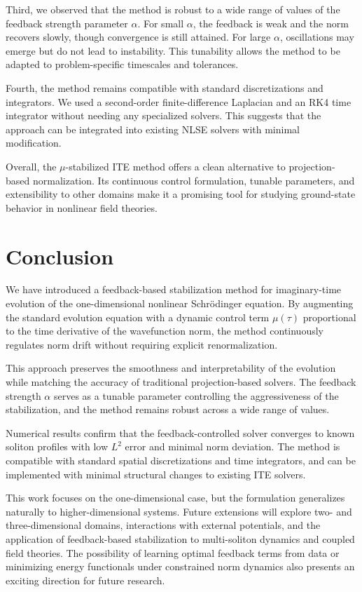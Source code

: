 \documentclass[12pt]{article}
\begin{document}
Third, we observed that the method is robust to a wide range of values of the feedback strength parameter $\alpha$. For small $\alpha$, the feedback is weak and the norm recovers slowly, though convergence is still attained. For large $\alpha$, oscillations may emerge but do not lead to instability. This tunability allows the method to be adapted to problem-specific timescales and tolerances.

Fourth, the method remains compatible with standard discretizations and integrators. We used a second-order finite-difference Laplacian and an RK4 time integrator without needing any specialized solvers. This suggests that the approach can be integrated into existing NLSE solvers with minimal modification.

Overall, the $\mu$-stabilized ITE method offers a clean alternative to projection-based normalization. Its continuous control formulation, tunable parameters, and extensibility to other domains make it a promising tool for studying ground-state behavior in nonlinear field theories.

\newpage
\section{Conclusion}

We have introduced a feedback-based stabilization method for imaginary-time evolution of the one-dimensional nonlinear Schrödinger equation. By augmenting the standard evolution equation with a dynamic control term $\mu(\tau)$ proportional to the time derivative of the wavefunction norm, the method continuously regulates norm drift without requiring explicit renormalization.

This approach preserves the smoothness and interpretability of the evolution while matching the accuracy of traditional projection-based solvers. The feedback strength $\alpha$ serves as a tunable parameter controlling the aggressiveness of the stabilization, and the method remains robust across a wide range of values.

Numerical results confirm that the feedback-controlled solver converges to known soliton profiles with low $L^2$ error and minimal norm deviation. The method is compatible with standard spatial discretizations and time integrators, and can be implemented with minimal structural changes to existing ITE solvers.

This work focuses on the one-dimensional case, but the formulation generalizes naturally to higher-dimensional systems. Future extensions will explore two- and three-dimensional domains, interactions with external potentials, and the application of feedback-based stabilization to multi-soliton dynamics and coupled field theories. The possibility of learning optimal feedback terms from data or minimizing energy functionals under constrained norm dynamics also presents an exciting direction for future research.
\end{document}
